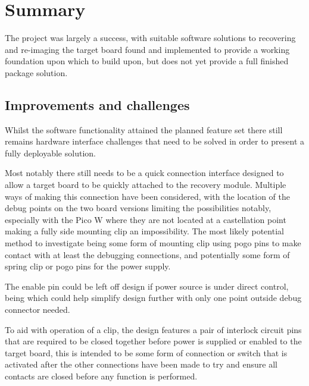 \clearpage%
\vspace{21.5pt}
\chapter{Summary}

The project was largely a success, with suitable software solutions to recovering and re-imaging the target board found and implemented to provide a working foundation upon which to build upon, but does not yet provide a full finished package solution.

\section{Improvements and challenges}

Whilst the software functionality attained the planned feature set there still remains hardware interface challenges that need to be solved in order to present a fully deployable solution.

Most notably there still needs to be a quick connection interface designed to allow a target board to be quickly attached to the recovery module. Multiple ways of making this connection have been considered, with the location of the debug points on the two board versions limiting the possibilities notably, especially with the Pico W where they are not located at a castellation point making a fully side mounting clip an impossibility.  The most likely potential method to investigate being some form of mounting clip using pogo pins to make contact with at least the debugging connections, and potentially some form of spring clip or pogo pins for the power supply.

The enable pin could be left off design if power source is under direct control, being which could help simplify design further with only one point outside debug connector needed.

To aid with operation of a clip, the design features a pair of interlock circuit pins that are required to be closed together before power is supplied or enabled to the target board, this is intended to be some form of connection or switch that is activated after the other connections have been made to try and ensure all contacts are closed before any function is performed.

